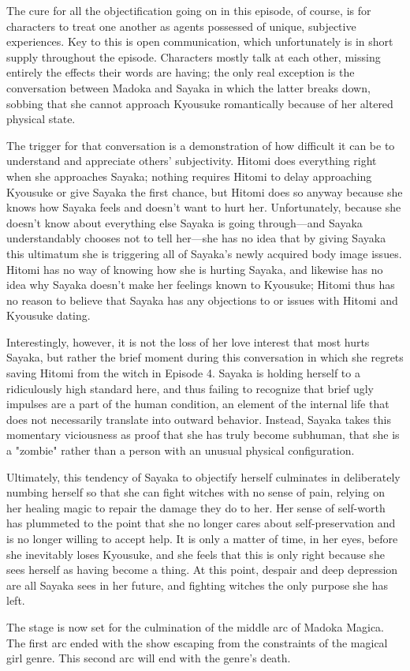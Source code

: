 The cure for all the objectification going on in this episode, of course, is for characters to treat one another as agents possessed of unique, subjective experiences. Key to this is open communication, which unfortunately is in short supply throughout the episode. Characters mostly talk at each other, missing entirely the effects their words are having; the only real exception is the conversation between Madoka and Sayaka in which the latter breaks down, sobbing that she cannot approach Kyousuke romantically because of her altered physical state.

The trigger for that conversation is a demonstration of how difficult it can be to understand and appreciate others' subjectivity. Hitomi does everything right when she approaches Sayaka; nothing requires Hitomi to delay approaching Kyousuke or give Sayaka the first chance, but Hitomi does so anyway because she knows how Sayaka feels and doesn't want to hurt her. Unfortunately, because she doesn't know about everything else Sayaka is going through—and Sayaka understandably chooses not to tell her—she has no idea that by giving Sayaka this ultimatum she is triggering all of Sayaka's newly acquired body image issues. Hitomi has no way of knowing how she is hurting Sayaka, and likewise has no idea why Sayaka doesn't make her feelings known to Kyousuke; Hitomi thus has no reason to believe that Sayaka has any objections to or issues with Hitomi and Kyousuke dating.

Interestingly, however, it is not the loss of her love interest that most hurts Sayaka, but rather the brief moment during this conversation in which she regrets saving Hitomi from the witch in Episode 4. Sayaka is holding herself to a ridiculously high standard here, and thus failing to recognize that brief ugly impulses are a part of the human condition, an element of the internal life that does not necessarily translate into outward behavior. Instead, Sayaka takes this momentary viciousness as proof that she has truly become subhuman, that she is a "zombie" rather than a person with an unusual physical configuration.

Ultimately, this tendency of Sayaka to objectify herself culminates in deliberately numbing herself so that she can fight witches with no sense of pain, relying on her healing magic to repair the damage they do to her. Her sense of self-worth has plummeted to the point that she no longer cares about self-preservation and is no longer willing to accept help. It is only a matter of time, in her eyes, before she inevitably loses Kyousuke, and she feels that this is only right because she sees herself as having become a thing. At this point, despair and deep depression are all Sayaka sees in her future, and fighting witches the only purpose she has left.

The stage is now set for the culmination of the middle arc of Madoka Magica. The first arc ended with the show escaping from the constraints of the magical girl genre. This second arc will end with the genre's death.
